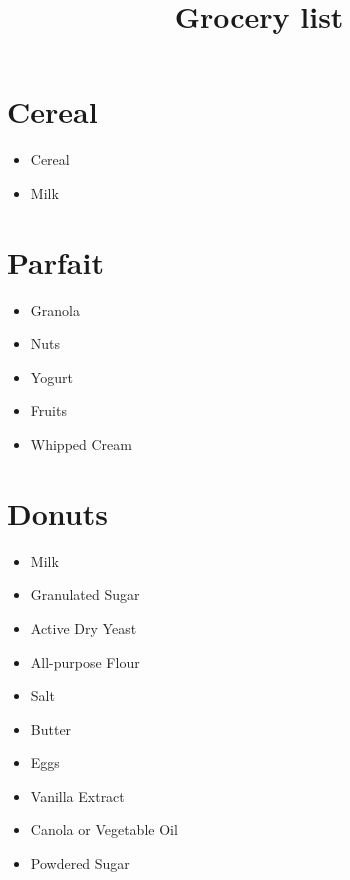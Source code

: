 \documentclass[10pt]{extarticle}
\title{Grocery list}
\begin{document}
		\twocolumn
		\maketitle
		\noindent
		\section{Cereal}
		\begin{itemize}
				\item Cereal
				\item Milk
		\end{itemize}
		\section{Parfait}
		\begin{itemize}
				\item Granola
				\item Nuts
				\item Yogurt 
				\item Fruits
				\item Whipped Cream
		\end{itemize}	
		\section{Donuts}
		\begin{itemize}
				\item Milk
				\item Granulated Sugar 
				\item Active Dry Yeast 
				\item All-purpose Flour
				\item Salt
				\item Butter
				\item Eggs
				\item Vanilla Extract
				
				\item Canola or Vegetable Oil
				\item Powdered Sugar
				
		\end{itemize}
\end{document}
